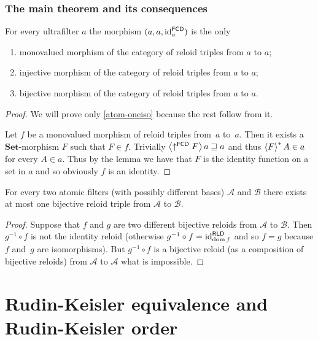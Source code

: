 \subsubsection{The main theorem and its consequences}
\begin{thm}
For every ultrafilter $a$ the morphism $(a,a,{\operatorname{id}}_{a}^{\mathsf{FCD}})$
is the only
\begin{enumerate}
\item \label{atom-oneiso}monovalued morphism of the category of reloid
triples from $a$ to $a$;
\item injective morphism of the category of reloid triples from $a$ to
$a$;
\item bijective morphism of the category of reloid triples from $a$ to
$a$.
\end{enumerate}
\end{thm}
\begin{proof}
We will prove only \ref{atom-oneiso} because the rest follow from
it.

Let $f$ be a monovalued morphism of reloid triples from~$a$ to~$a$.
Then it exists a $\mathbf{Set}$-morphism $F$ such that $F\in f$.
Trivially $\left\langle \uparrow^{\mathsf{FCD}}F\right\rangle a\sqsupseteq a$ and thus
$\left\langle F\right\rangle ^{\ast}A\in a$ for every $A\in a$. Thus by the lemma we have
that $F$ is the identity function on a set in $a$ and so obviously
$f$ is an identity.\end{proof}
\begin{cor}
For every two atomic filters (with possibly different bases) $\mathcal{A}$
and $\mathcal{B}$ there exists at most one bijective reloid triple
from $\mathcal{A}$ to $\mathcal{B}$.\end{cor}
\begin{proof}
Suppose that $f$ and $g$ are two different bijective reloids from
$\mathcal{A}$ to $\mathcal{B}$. Then $g^{-1}\circ f$ is not the
identity reloid (otherwise $g^{-1}\circ f={\operatorname{id}}_{\operatorname{dom} f}^{\mathsf{RLD}}$
and so $f=g$ because $f$ and~$g$ are isomorphisms). But $g^{-1}\circ f$ is a bijective reloid (as a composition
of bijective reloids) from $\mathcal{A}$ to $\mathcal{A}$ what is
impossible.
\end{proof}

\section{Rudin-Keisler equivalence and Rudin-Keisler order}

